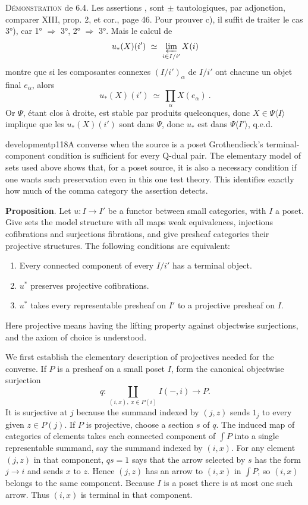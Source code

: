 \textsc{Démonstration} de 6.4. Les assertions  ,  sont $\pm$ tautologiques, par adjonction, comparer XIII, prop. 2, et cor., page 46. Pour prouver c), il suffit de traiter le cas 3°), car 1° $\Longrightarrow$ 3°, 2° $\Longrightarrow$ 3°. Mais le calcul de
\[
u_*(X)(i')\ \simeq\ \varprojlim_{i\in I/i'} X(i)
\]
montre que si les composantes connexes $(I/i')_\alpha$ de $I/i'$ ont chacune un objet final $e_\alpha$, alors
\[
u_*(X)(i')\ \simeq\ \prod_\alpha X(e_\alpha)\ .
\]
Or $\Psi$, étant clos à droite, est stable par produits quelconques, donc $X \in \Psi\langle I\rangle$ implique que les $u_*(X)(i')$ sont dans $\Psi$, donc $u_*$ est dans $\Psi\langle I'\rangle$, q.e.d.


\begin{dcomment}{development}{p118}{A converse when the source is a poset}
Grothendieck's terminal-component condition is sufficient for every Q-dual pair. The elementary model of sets used above shows that, for a poset source, it is also a necessary condition if one wants such preservation even in this one test theory. This identifies exactly how much of the comma category the assertion detects.

\textbf{Proposition}\ours.
Let $u:I\to I'$ be a functor between small categories, with $I$ a poset. Give sets the model structure with all maps weak equivalences, injections cofibrations and surjections fibrations, and give presheaf categories their projective structures. The following conditions are equivalent:
\begin{enumerate}
\item Every connected component of every $I/i'$ has a terminal object.
\item $u^*$ preserves projective cofibrations.
\item $u^*$ takes every representable presheaf on $I'$ to a projective presheaf on $I$.
\end{enumerate}
Here projective means having the lifting property against objectwise surjections, and the axiom of choice is understood.

We first establish the elementary description of projectives needed for the converse. If $P$ is a presheaf on a small poset $I$, form the canonical objectwise surjection
\[
 q:\coprod_{(i,x),\ x\in P(i)} I(-,i)\longrightarrow P.
\]
It is surjective at $j$ because the summand indexed by $(j,z)$ sends $1_j$ to every given $z\in P(j)$. If $P$ is projective, choose a section $s$ of $q$. The induced map of categories of elements takes each connected component of $\int P$ into a single representable summand, say the summand indexed by $(i,x)$. For any element $(j,z)$ in that component, $qs=1$ says that the arrow selected by $s$ has the form $j\to i$ and sends $x$ to $z$. Hence $(j,z)$ has an arrow to $(i,x)$ in $\int P$, so $(i,x)$ belongs to the same component. Because $I$ is a poset there is at most one such arrow. Thus $(i,x)$ is terminal in that component.


\end{dcomment}
